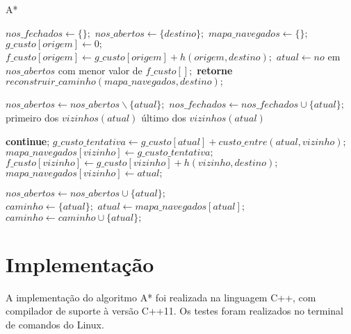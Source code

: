 \documentclass[12pt]{article}
\begin{document}
\begin{algorithm}[H]
	\caption{A*}
\begin{algorithmic}[1]

		\State $nos\_fechados\gets \{\};$ $nos\_abertos\gets \{destino\};$
		\State $mapa\_navegados \gets \{\};$ 
		\State $g\_custo[origem] \gets 0;$ 
		\State $f\_custo[origem] \gets g\_custo[origem] + h(origem, destino);$ 
		\State $atual\gets no$ em $nos\_abertos$ com menor valor de $f\_custo[];$
		\State \textbf{retorne} $reconstruir\_caminho(mapa\_navegados, destino);$
		\EndIf
		
		\State $nos\_abertos \gets nos\_abertos \backslash \{atual\};$
		\State $nos\_fechados \gets nos\_fechados \cup \{atual\};$
		 {primeiro dos $vizinhos(atual)$} {último dos $vizinhos(atual)$}
		
			\State \textbf{continue};
			\EndIf
			\State $g\_custo\_tentativa \gets g\_custo[atual]+custo\_entre(atual, vizinho);$
			\State $mapa\_navegados[vizinho] \gets g\_custo\_tentativa;$
			\State $f\_custo[vizinho] \gets g\_custo[vizinho]+h(vizinho, destino);$ 
			\State $mapa\_navegados[vizinho] \gets atual;$ 
		\end{algorithmic}
\end{algorithm}		
\begin{algorithm}	
		\begin{algorithmic}[1]
			\State $nos\_abertos \gets nos\_abertos \cup \{atual\};$
			\EndIf
			\EndIf
			\EndFor
			\EndWhile
			\EndFunction\\
			
			\State $caminho \gets \{atual\};$ 
			\State $atual \gets mapa\_navegados[atual];$ 
			\State $caminho \gets caminho \cup \{atual\};$ 
			\EndWhile
			\EndFunction
\end{algorithmic}
\end{algorithm}

\section{Implementação}

A implementação do algoritmo A* foi realizada na linguagem C++, com compilador de suporte à versão C++11. Os testes foram realizados no terminal de comandos do Linux.
\end{document}
